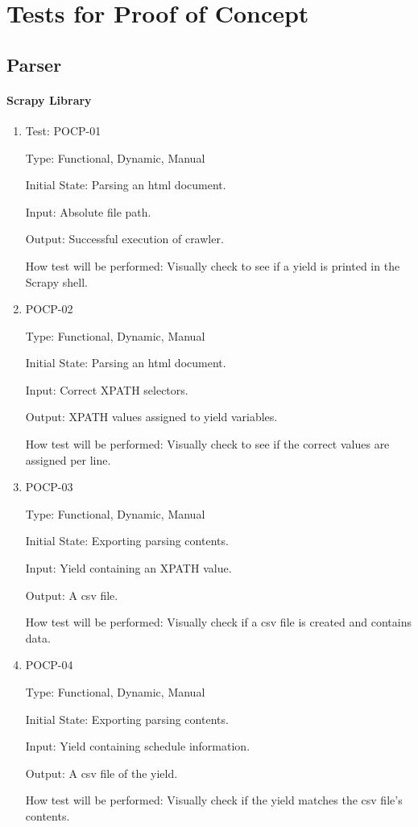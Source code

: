 \documentclass[12pt, titlepage]{article}
\begin{document}
\section{Tests for Proof of Concept}

\subsection{Parser}
		
\paragraph{Scrapy Library}

\begin{enumerate}

\item{Test: POCP-01\\}

Type: Functional, Dynamic, Manual
					
Initial State: Parsing an html document.
					
Input: Absolute file path.
					
Output: Successful execution of crawler.
					
How test will be performed: Visually check to see if a yield is printed in the Scrapy shell.

					
\item{POCP-02\\}

Type: Functional, Dynamic, Manual
					
Initial State: Parsing an html document.
					
Input: Correct XPATH selectors.
					
Output: XPATH values assigned to yield variables.
					
How test will be performed: Visually check to see if the correct values are assigned per line.


\item{POCP-03\\}

Type: Functional, Dynamic, Manual
					
Initial State: Exporting parsing contents.
					
Input: Yield containing an XPATH value.
					
Output: A csv file.
					
How test will be performed: Visually check if a csv file is created and contains data.

\item{POCP-04\\}

Type: Functional, Dynamic, Manual
					
Initial State: Exporting parsing contents.
					
Input: Yield containing schedule information.
					
Output: A csv file of the yield.
					
How test will be performed: Visually check if the yield matches the csv file's contents.



\end{enumerate}
\end{document}
